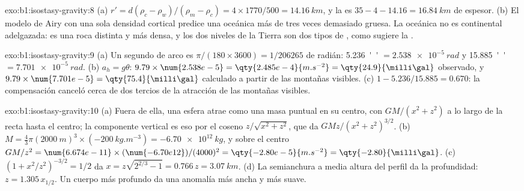 \begin{solution}{exo:b1:isostasy-gravity:8}
(a) $r' = d(\rho_c - \rho_w)/(\rho_m - \rho_c) = 4\times1770/500 =
\qty{14.16}{km}$, y la  es $35 - 4 - 14.16 = \qty{16.84}{km}$ de espesor.
(b) El modelo de Airy con una sola densidad cortical predice una  oceánica más de
tres veces demasiado gruesa. La  oceánica no es  continental adelgazada: es
una roca distinta y más densa, y los dos niveles de la Tierra son dos tipos de ,
como sugiere la .
\end{solution}

\begin{solution}{exo:b1:isostasy-gravity:9}
(a) Un segundo de arco es $\pi/(180\times3600) = 1/\num{206265}$ de radián:
\qty{5.236}{''} $= \qty{2.538e-5}{rad}$ y \qty{15.885}{''} $=
\qty{7.701e-5}{rad}$. (b) $a_h = g\theta$: $9.79\times\num{2.538e-5} =
\qty{2.485e-4}{m.s^{-2}} = \qty{24.9}{\milli\gal}$ observado, y
$9.79\times\num{7.701e-5} = \qty{75.4}{\milli\gal}$ calculado a partir de las
montañas visibles. (c) $1 - 5.236/15.885 = 0.670$: la compensación canceló cerca de
dos tercios de la atracción de las montañas visibles.
\end{solution}

\begin{solution}{exo:b1:isostasy-gravity:10}
(a) Fuera de ella, una esfera atrae como una masa puntual en su centro, con
$GM/(x^2 + z^2)$ a lo largo de la recta hasta el centro; la componente vertical es eso
por el coseno $z/\sqrt{x^2 + z^2}$, que da $GMz/(x^2 + z^2)^{3/2}$.
(b) $M = \tfrac43\pi(\qty{2000}{m})^3\times(\qty{-200}{kg.m^{-3}}) =
\qty{-6.70e12}{kg}$, y sobre el centro $GM/z^2 = \num{6.674e-11}\times
(\num{-6.70e12})/(4000)^2 = \qty{-2.80e-5}{m.s^{-2}} = \qty{-2.80}{\milli\gal}$.
(c) $(1 + x^2/z^2)^{-3/2} = 1/2$ da $x = z\sqrt{2^{2/3} - 1} = 0.766\,z =
\qty{3.07}{km}$. (d) La semianchura a media altura del perfil da la profundidad:
$z = 1.305\,x_{1/2}$. Un cuerpo más profundo da una anomalía más ancha y más suave.
\end{solution}

